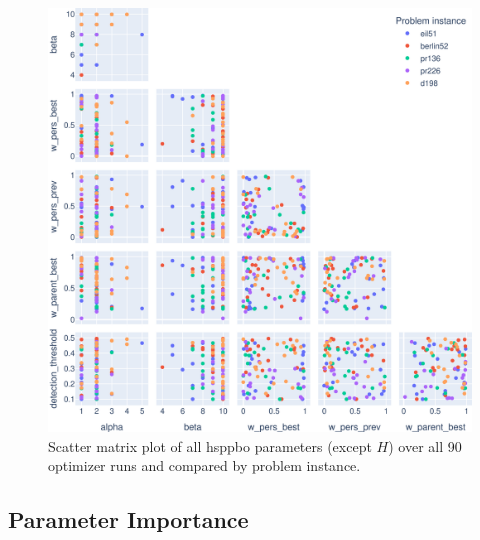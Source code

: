 \begin{figure}[h]
	\centering
	\includegraphics[width=\textwidth]{results/part2/param_scatter_matrix_problem.svg}
	\caption[Scatter matrix plot of all \gls{hsppbo} parameters compared by problem instance.]{Scatter matrix plot of all \gls{hsppbo} parameters (except $H$) over all 90 optimizer runs and compared by problem instance.}
	\label{fig:parameter_scatter_matrix_problem}
\end{figure}
\subsection{Parameter Importance}

